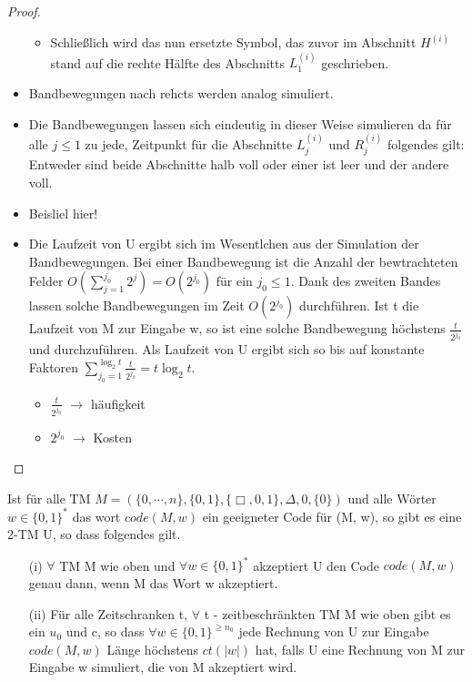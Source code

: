 \begin{proof}
\begin{itemize}
\begin{itemize}
                    \item Schließlich wird das nun ersetzte Symbol, das zuvor im Abschnitt \(H^{(i)}\) stand auf die rechte Hälfte des Abschnitts \(L_1^{(i)}\) geschrieben.
                \end{itemize}
                \item Bandbewegungen nach rehcts werden analog simuliert.
                \item Die Bandbewegungen lassen sich eindeutig in dieser Weise simulieren da für alle \( j \leq 1\) zu jede, Zeitpunkt für die Abschnitte \(L_j^{(i)}\) und \(R_j^{(i)}\) folgendes gilt: Entweder sind beide Abschnitte halb voll oder einer ist leer und der andere voll.
                \item Beisliel hier!
                \item Die Laufzeit von U ergibt sich im Wesentlchen aus der Simulation der Bandbewegungen. Bei einer Bandbewegung ist die Anzahl der bewtrachteten Felder \(O(\sum\limits_{j = 1}^{j_0} 2^j) = O(2^{j_0})\) für ein \(j_0 \leq 1\). Dank des zweiten Bandes lassen solche Bandbewegungen im Zeit \(O(2^{j_0})\) durchführen. Ist t die Laufzeit von M zur Eingabe w, so ist eine solche Bandbewegung höchstens \(\frac{t}{2^{j_0}}\) und durchzuführen. Als Laufzeit von U ergibt sich so bis auf konstante Faktoren \(\sum\limits_{j_0 = 1}^{\log_2 t} \frac{t}{2^{j_0}} = t\log_2 t\).
                \begin{itemize}
                    \item \(\frac{t}{2^{j_0}}\) \(\to\) häufigkeit
                    \item \(2^{j_0}\) \(\to \) Kosten
                \end{itemize}
            \end{itemize}
    \end{proof}
\newpage
{}
    Ist für alle TM \(M = (\{0, \cdots, n\}, \{0, 1\}, \{\Box, 0, 1\}, \Delta, 0, \{0\})\) und alle Wörter \(w \in \{0, 1\}^*\) das wort \(code(M, w)\) ein geeigneter Code für (M, w), so gibt es eine 2-TM U, so dass folgendes gilt.
    \begin{itemize}
        \item [(i)] \(\forall\) TM M wie oben und \(\forall w \in \{0, 1\}^*\) akzeptiert U den Code \(code(M, w)\) genau dann, wenn M das Wort w akzeptiert.
        \item [(ii)] Für alle Zeitschranken t, \(\forall\) t - zeitbeschränkten TM M wie oben gibt es ein \(u_0\) und c, so dass \(\forall w \in \{0, 1\}^{\geq n_0}\) jede Rechnung von U zur Eingabe \(code(M, w)\) Länge höchstens \(ct(|w|)\) hat, falls U eine Rechnung von M zur Eingabe w simuliert, die von M akzeptiert wird.
    \end{itemize}
